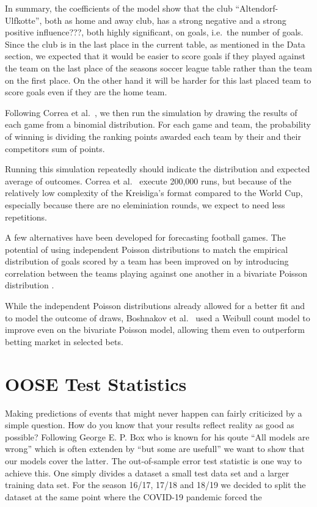 \documentclass[12pt,a4paper]{article}
\begin{document}
In summary, the coefficients of the model show that the club
\enquote{Altendorf-Ulfkotte}, both as home and away club, has a strong
negative and a strong positive influence???, both highly significant, on
goals, i.e.~the number of goals. Since the club is in the last place in
the current table, as mentioned in the Data section, we expected that it
would be easier to score goals if they played against the team on the
last place of the seasons soccer league table rather than the team on
the first place. On the other hand it will be harder for this last
placed team to score goals even if they are the home team.

Following Correa et al.~\autocite*{correa}, we then run the simulation
by drawing the results of each game from a binomial distribution. For
each game and team, the probability of winning is dividing the ranking
points awarded each team by their and their competitors sum of points.

Running this simulation repeatedly should indicate the distribution and
expected average of outcomes. Correa et al.~\autocite*{correa} execute
200,000 runs, but because of the relatively low complexity of the
Kreisliga's format compared to the World Cup, especially because there
are no eleminiation rounds, we expect to need less repetitions.

A few alternatives have been developed for forecasting football games.
The potential of using independent Poisson distributions to match the
empirical distribution of goals scored by a team has been improved on by
introducing correlation between the teams playing against one another in
a bivariate Poisson distribution \textcite{karlis2003}.

While the independent Poisson distributions already allowed for a better
fit and to model the outcome of draws, Boshnakov et
al.~\autocite*{boshnakov2016} used a Weibull count model to improve even
on the bivariate Poisson model, allowing them even to outperform betting
market in selected bets.

\hypertarget{oose-test-statistics}{%
\section{OOSE Test Statistics}\label{oose-test-statistics}}

Making predictions of events that might never happen can fairly
criticized by a simple question. How do you know that your results
reflect reality as good as possible? Following George E. P. Box who is
known for his qoute \enquote{All models are wrong} which is often
extenden by \enquote{but some are usefull} we want to show that our
models cover the latter. The out-of-sample error test statistic is one
way to achieve this. One simply divides a dataset a small test data set
and a larger training data set. For the season 16/17, 17/18 and 18/19 we
decided to split the dataset at the same point where the COVID-19
pandemic forced the
\end{document}
